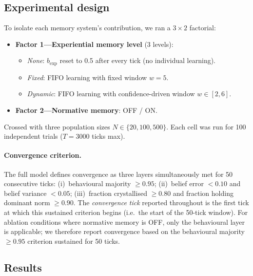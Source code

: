 \documentclass[11pt,a4paper]{article}
\begin{document}
\subsection{Experimental design}

To isolate each memory system's contribution, we ran a $3 \times 2$ factorial:

\begin{itemize}[nosep]
\item \textbf{Factor 1---Experiential memory level} (3 levels):
  \begin{itemize}[nosep]
    \item \emph{None}: $b_{\exp}$ reset to 0.5 after every tick (no individual learning).
    \item \emph{Fixed}: FIFO learning with fixed window $w = 5$.
    \item \emph{Dynamic}: FIFO learning with confidence-driven window $w \in [2, 6]$.
  \end{itemize}
\item \textbf{Factor 2---Normative memory}: OFF / ON.
\end{itemize}

Crossed with three population sizes $N \in \{20, 100, 500\}$. Each cell was run for 100 independent trials ($T = 3000$ ticks max).

\paragraph{Convergence criterion.} The full model defines convergence as three layers simultaneously met for 50 consecutive ticks: (i)~behavioural majority $\geq 0.95$; (ii)~belief error $< 0.10$ and belief variance $< 0.05$; (iii)~fraction crystallised $\geq 0.80$ and fraction holding dominant norm $\geq 0.90$. The \emph{convergence tick} reported throughout is the first tick at which this sustained criterion begins (i.e.\ the start of the 50-tick window). For ablation conditions where normative memory is OFF, only the behavioural layer is applicable; we therefore report convergence based on the behavioural majority $\geq 0.95$ criterion sustained for 50 ticks.

\subsection{Results}
\end{document}
